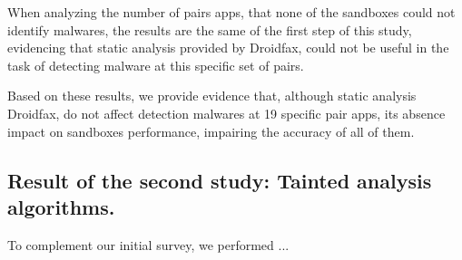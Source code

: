 When analyzing the number of pairs apps, that none of the sandboxes could not identify malwares, the results are the same of the first step of this study, evidencing that static analysis provided by Droidfax, could not be useful in the task of detecting malware at this specific set of pairs.

Based on these results, we provide evidence that, although static analysis Droidfax, do not affect detection malwares at 19 specific pair apps, its absence impact on sandboxes performance, impairing the accuracy of all of them.

\subsection{Result of the second study: Tainted analysis algorithms.}

To complement our initial survey, we performed ...


